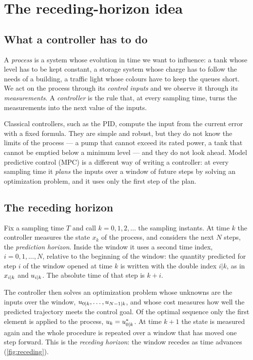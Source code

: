 \section{The receding-horizon idea}
\label{sec:intro}

\subsection{What a controller has to do}

A \emph{process} is a system whose evolution in time we want to influence: a tank whose
level has to be kept constant, a storage system whose charge has to follow the needs of a
building, a traffic light whose colours have to keep the queues short. We act on the process
through its \emph{control inputs} and we observe it through its \emph{measurements}. A
\emph{controller} is the rule that, at every sampling time, turns the measurements into the next
value of the inputs.

Classical controllers, such as the PID, compute the input from the current error with a fixed
formula. They are simple and robust, but they do not know the limits of the process --- a pump
that cannot exceed its rated power, a tank that cannot be emptied below a minimum level --- and
they do not look ahead. Model predictive control (MPC) is a different way of writing a controller:
at every sampling time it \emph{plans} the inputs over a window of future steps by solving an
optimization problem, and it uses only the first step of the plan.

\subsection{The receding horizon}

Fix a sampling time $T$ and call $k = 0, 1, 2, \dots$ the sampling instants. At time $k$ the
controller measures the state $x_k$ of the process, and considers the next $N$ steps, the
\emph{prediction horizon}. Inside the window it uses a second time index, $i = 0, 1, \dots, N$,
relative to the beginning of the window: the quantity predicted for step $i$ of the window opened
at time $k$ is written with the double index $i|k$, as in $x_{{i|k}}$ and $u_{{i|k}}$. The
absolute time of that step is $k + i$.

The controller then solves an optimization problem whose unknowns are the inputs over the
window, $u_{{0|k}}, \dots, u_{{N-1|k}}$, and whose cost measures how well the predicted
trajectory meets the control goal. Of the optimal sequence only the first element is applied to
the process, $u_k = u^*_{{0|k}}$. At time $k+1$ the state is measured again and the whole
procedure is repeated over a window that has moved one step forward. This is the
\emph{receding horizon}: the window recedes as time advances (\cref{fig:receding}).

